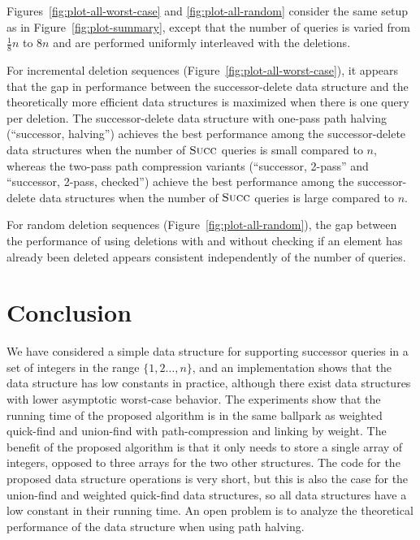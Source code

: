 \documentclass[a4paper]{lipics-v2021}
\newcommand{\FuncName}[1]{\textup{\textsc{#1}}}
\newcommand{\Succ}{\FuncName{Succ}}
\begin{document}
Figures~\ref{fig:plot-all-worst-case} and \ref{fig:plot-all-random} consider the same setup as in Figure~\ref{fig:plot-summary}, except that the number of queries is varied from $\frac{1}{8}n$ to $8n$ and are performed uniformly interleaved with the deletions. 

For incremental deletion sequences (Figure~\ref{fig:plot-all-worst-case}), it appears that the gap in performance between the successor-delete data structure and the theoretically more efficient data structures is maximized when there is one query per deletion. 
The successor-delete data structure with one-pass path halving (``successor, halving'') achieves the best performance among the successor-delete data structures when the number of $\Succ$ queries is small compared to $n$, whereas the two-pass path compression variants (``successor, 2-pass'' and ``successor, 2-pass, checked'') achieve the best performance among the successor-delete data structures when the number of $\Succ$ queries is large compared to $n$.

For random deletion sequences (Figure~\ref{fig:plot-all-random}), the gap between the performance of using deletions with and without checking if an element has already been deleted appears consistent independently of the number of queries.

\section{Conclusion}

We have considered a simple data structure for supporting successor queries in a set of integers in the range $\{1,2\ldots,n\}$, and an implementation shows that the data structure has low constants in practice, although there exist data structures with lower asymptotic worst-case behavior. The experiments show that the running time of the proposed algorithm is in the same ballpark as weighted quick-find and union-find with path-compression and linking by weight. The benefit of the proposed algorithm is that it only needs to store a single array of integers, opposed to three arrays for the two other structures. The code for the proposed data structure operations is very short, but this is also the case for the union-find and weighted quick-find data structures, so all data structures have a low constant in their running time. An open problem is to analyze the theoretical performance of the data structure when using path halving.
\end{document}
